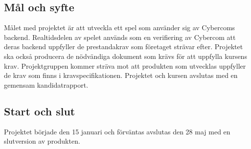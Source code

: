\subsection{Mål och syfte}
Målet med projektet är att utveckla ett spel som använder sig av Cybercoms backend. Realtidsdelen av spelet används som en verifiering av Cybercom att deras backend uppfyller de prestandakrav som företaget strävar efter. Projektet ska också producera de nödvändiga dokument som krävs för att uppfylla kursens krav\cite{bib-tddd96}. Projektgruppen kommer sträva mot att produkten som utvecklas uppfyller de krav som finns i kravspecifikationen\cite{bib-kravspec}. Projektet och kursen avslutas med en gemensam kandidatrapport.



\subsection{Start och slut}
Projektet började den 15 januari och förväntas avslutas den 28 maj med en slutversion av produkten.

\pagebreak
